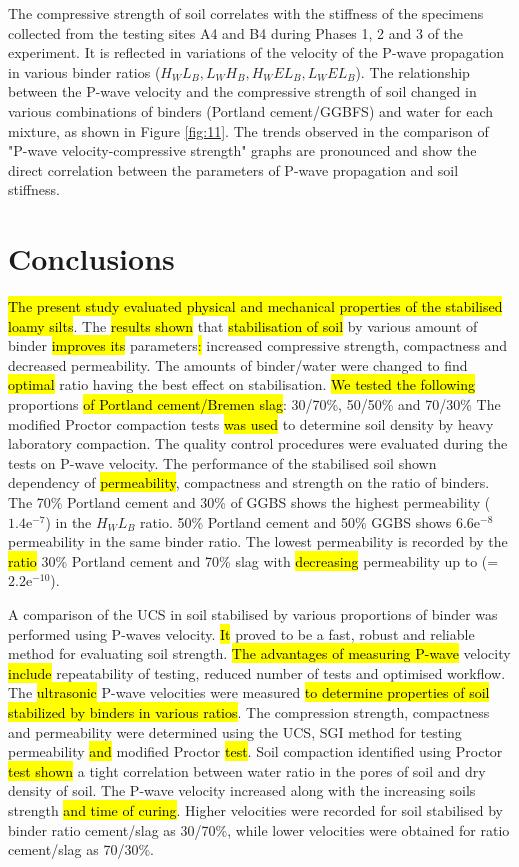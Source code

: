 \documentclass{amestyle}
\begin{document}
The compressive strength of soil correlates with the stiffness of the specimens collected from the testing sites A4 and B4 during Phases 1, 2 and 3 of the experiment. It is reflected in variations of the velocity of the P-wave propagation in various binder ratios ($H_WL_B, L_WH_B, H_WEL_B, L_WEL_B$). The relationship between the P-wave velocity and the compressive strength of soil changed in various combinations of binders (Portland cement/GGBFS) and water for each mixture, as shown in Figure \ref{fig:11}. The trends observed in the comparison of "P-wave velocity-compressive strength" graphs are pronounced and show the direct correlation between the parameters of P-wave propagation and soil stiffness. 

\section{Conclusions}
\label{sec:conclusions}

\hl{The present study evaluated physical and mechanical properties of the stabilised loamy silts}. The \hl{results shown} that \hl{stabilisation of soil} by various amount of binder \hl{improves its} parameters\hl{: }increased compressive strength, compactness and decreased permeability. The amounts of binder/water were changed to find \hl{optimal} ratio having the best effect on stabilisation. \hl{We tested the following} proportions \hl{of Portland cement/Bremen slag}: 30/70\%, 50/50\% and 70/30\% The modified Proctor compaction tests \hl{was used} to determine soil density by heavy laboratory compaction. The quality control procedures were evaluated during the tests on P-wave velocity. The performance of the stabilised soil shown dependency of \hl{permeability}, compactness and strength on the ratio of binders. The 70\% Portland cement and 30\% of GGBS shows the highest permeability ($1.4\mathrm{e}^{-7}$) in the $H_WL_B$ ratio. 50\% Portland cement and 50\% GGBS shows $6.6\mathrm{e}^{-8}$ permeability in the same binder ratio. The lowest permeability is recorded by the \hl{ratio} 30\% Portland cement and 70\% slag with \hl{decreasing} permeability up to (=$2.2\mathrm{e}^{-10}$).

A comparison of the UCS in soil stabilised by various proportions of binder was performed using P-waves velocity. \hl{It} proved to be a fast, robust and reliable method for evaluating  soil strength. \hl{The advantages of measuring P-wave} velocity \hl{include} repeatability of testing, reduced number of tests and optimised workflow. The \hl{ultrasonic} P-wave velocities were measured \hl{to determine properties of soil stabilized by binders in various ratios}. The compression strength, compactness and permeability were determined using the UCS, SGI method for testing permeability\hl{ and} modified Proctor \hl{test}. Soil compaction identified using Proctor \hl{test shown} a tight correlation between water ratio in the pores of soil and dry density of soil. The P-wave velocity increased along with the increasing soils strength \hl{and time of curing}. Higher velocities were recorded for soil stabilised by binder ratio cement/slag as 30/70\%, while lower velocities were obtained for ratio cement/slag as 70/30\%. 
\end{document}
